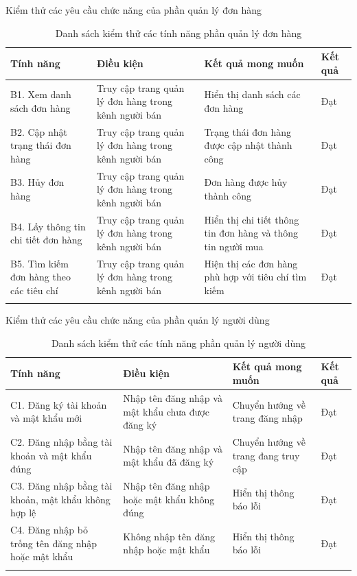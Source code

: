 Kiểm thử các yêu cầu chức năng của phần quản lý đơn hàng
\begin{longtable}{| m{4cm} | m{4cm} | m{4cm} | m{1.5cm} |}
    \hline
    \bf Tính năng & \bf Điều kiện & \bf Kết quả mong muốn & \bf Kết quả \\ 
    \hline    
    B1. Xem danh sách đơn hàng & Truy cập trang quản lý đơn hàng trong kênh người bán & Hiển thị danh sách các đơn hàng & Đạt  \\ 
    \hline
    B2. Cập nhật trạng thái đơn hàng & Truy cập trang quản lý đơn hàng trong kênh người bán & Trạng thái đơn hàng được cập nhật thành công & Đạt  \\ 
    \hline
    B3. Hủy đơn hàng & Truy cập trang quản lý đơn hàng trong kênh người bán & Đơn hàng được hủy thành công & Đạt \\   
    \hline
    B4. Lấy thông tin chi tiết đơn hàng & Truy cập trang quản lý đơn hàng trong kênh người bán & Hiển thị chi tiết thông tin đơn hàng và thông tin người mua & Đạt \\   
    \hline
    B5. Tìm kiếm đơn hàng theo các tiêu chí & Truy cập trang quản lý đơn hàng trong kênh người bán & Hiện thị các đơn hàng phù hợp với tiêu chí tìm kiếm & Đạt \\   
    \hline
    \caption{\label{demo-table} Danh sách kiểm thử các tính năng phần quản lý đơn hàng}
\end{longtable}

Kiểm thử các yêu cầu chức năng của phần quản lý người dùng
\begin{longtable}{| m{4cm} | m{4cm} | m{4cm} | m{1.5cm} |}
    \hline
    \bf Tính năng & \bf Điều kiện & \bf Kết quả mong muốn & \bf Kết quả \\ 
    \hline
    C1. Đăng ký tài khoản và mật khẩu mới & Nhập tên đăng nhập và mật khẩu chưa được đăng ký & Chuyển hướng về trang đăng nhập & Đạt  \\ 
    \hline
    C2. Đăng nhập bằng tài khoản và mật khẩu đúng & Nhập tên đăng nhập và mật khẩu đã đăng ký & Chuyển hướng về trang đang truy cập & Đạt  \\ 
    \hline
    C3. Đăng nhập bằng tài khoản, mật khẩu không hợp lệ & Nhập tên đăng nhập hoặc mật khẩu không đúng & Hiển thị thông báo lỗi & Đạt \\ 
    \hline
    C4. Đăng nhập bỏ trống tên đăng nhập hoặc mật khẩu & Không nhập tên đăng nhập hoặc mật khẩu & Hiển thị thông báo lỗi & Đạt \\   
    \hline
    \caption{\label{demo-table} Danh sách kiểm thử các tính năng phần quản lý người dùng}
\end{longtable}
